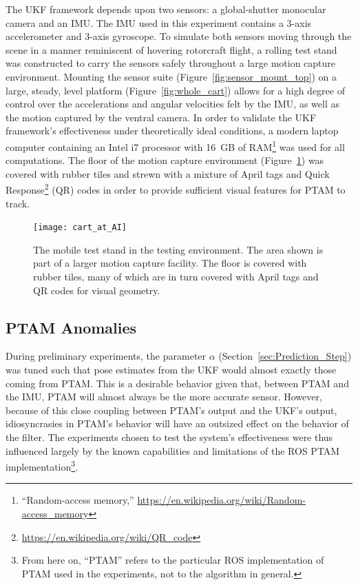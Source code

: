 The UKF framework depends upon two sensors: a global-shutter monocular camera and an IMU. The IMU used in this experiment contains a 3-axis accelerometer and 3-axis gyroscope. To simulate both sensors moving through the scene in a manner reminiscent of hovering rotorcraft flight, a rolling test stand was constructed to carry the sensors safely throughout a large motion capture environment. Mounting the sensor suite (Figure~\ref{fig:sensor_mount_top}) on a large, steady, level platform (Figure~\ref{fig:whole_cart}) allows for a high degree of control over the accelerations and angular velocities felt by the IMU, as well as the motion captured by the ventral camera. In order to validate the UKF framework's effectiveness under theoretically ideal conditions, a modern laptop computer containing an Intel i7 processor with 16~GB of RAM\footnote{``Random-access memory,'' \url{https://en.wikipedia.org/wiki/Random-access_memory}} was used for all computations. The floor of the motion capture environment (Figure~\ref{fig:cart_at_AI}) was covered with rubber tiles and strewn with a mixture of April tags and Quick Response\footnote{\url{https://en.wikipedia.org/wiki/QR_code}} (QR) codes in order to provide sufficient visual features for PTAM to track.

\begin{figure}[H]
  \centering
    \texttt{[image: cart\_at\_AI]}
  \caption[Testing Environment]{The mobile test stand in the testing environment. The area shown is part of a larger motion capture facility. The floor is covered with rubber tiles, many of which are in turn covered with April tags and QR codes for visual geometry.}
  \label{fig:cart_at_AI}
\end{figure}

\subsection{PTAM Anomalies}

During preliminary experiments, the parameter $\alpha$ (Section~\ref{sec:Prediction_Step}) was tuned such that pose estimates from the UKF would almost exactly those coming from PTAM. This is a desirable behavior given that, between PTAM and the IMU, PTAM will almost always be the more accurate sensor. However, because of this close coupling between PTAM's output and the UKF's output, idiosyncrasies in PTAM's behavior will have an outsized effect on the behavior of the filter. The experiments chosen to test the system's effectiveness were thus influenced largely by the known capabilities and limitations of the ROS PTAM implementation\footnote{From here on, ``PTAM'' refers to the particular ROS implementation of PTAM used in the experiments, not to the algorithm in general.}.

